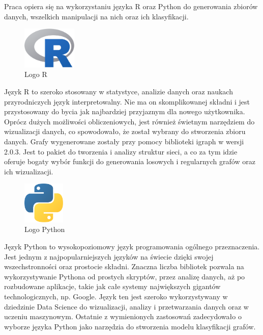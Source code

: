 Praca opiera się na wykorzystaniu języka R oraz Python do generowania zbiorów danych, wszelkich manipulacji na nich oraz ich klasyfikacji.

\begin{figure}[ht]
	\centering
	\includegraphics[height=2cm]{partials/images/logo_r.png}
	\caption{Logo R}
\label{Fig:R}
\end{figure}

Język R to szeroko stosowany w statystyce, analizie danych oraz naukach przyrodniczych język interpretowalny.
Nie ma on skomplikowanej składni i jest przystosowany do bycia jak najbardziej przyjaznym dla nowego użytkownika.
Oprócz dużych możliwości obliczeniowych, jest również świetnym narzędziem do wizualizacji danych,
co spowodowało, że został wybrany do stworzenia zbioru danych.
Grafy wygenerowane zostały przy pomocy biblioteki igraph w wersji 2.0.3.
Jest to pakiet do tworzenia i analizy struktur sieci, a co za tym idzie oferuje bogaty wybór funkcji do
generowania losowych i regularnych grafów oraz ich wizualizacji.

\begin{figure}[ht]
	\centering
	\includegraphics[height=2cm]{partials/images/logo_python.png}
	\caption{Logo Python}
\label{Fig:Python}
\end{figure}

Język Python to wysokopoziomowy język programowania ogólnego przeznaczenia. Jest
jednym z najpopularniejszych języków na świecie dzięki swojej wszechstronności oraz
prostocie składni. Znaczna liczba bibliotek pozwala na wykorzystywanie Pythona od
prostych skryptów, przez analizę danych, aż po rozbudowane aplikacje, takie jak całe
systemy największych gigantów technologicznych, np. Google. Język ten jest szeroko
wykorzystywany w dziedzinie Data Science do wizualizacji, analizy i przetwarzania danych oraz w uczeniu maszynowym.
Ostatnie z wymienionych zastosowań zadecydowało o wyborze języka Python jako narzędzia do stworzenia modelu klasyfikacji grafów.